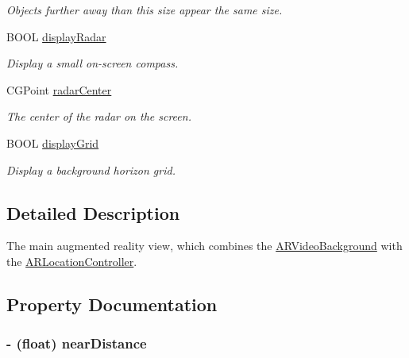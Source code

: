\begin{DoxyCompactItemize}
\begin{DoxyCompactList}\small\item\em Objects further away than this size appear the same size. \end{DoxyCompactList}\item 
\hypertarget{interface_a_r_browser_view_a541177be5371872bc4153d8eb8805ff2}{B\-O\-O\-L \hyperlink{interface_a_r_browser_view_a541177be5371872bc4153d8eb8805ff2}{display\-Radar}}\label{interface_a_r_browser_view_a541177be5371872bc4153d8eb8805ff2}

\begin{DoxyCompactList}\small\item\em Display a small on-\/screen compass. \end{DoxyCompactList}\item 
C\-G\-Point \hyperlink{interface_a_r_browser_view_ab390eeb9f2a9ce554dbbea33227cb389}{radar\-Center}
\begin{DoxyCompactList}\small\item\em The center of the radar on the screen. \end{DoxyCompactList}\item 
\hypertarget{interface_a_r_browser_view_a767b94294f4358686e88d043198b9881}{B\-O\-O\-L \hyperlink{interface_a_r_browser_view_a767b94294f4358686e88d043198b9881}{display\-Grid}}\label{interface_a_r_browser_view_a767b94294f4358686e88d043198b9881}

\begin{DoxyCompactList}\small\item\em Display a background horizon grid. \end{DoxyCompactList}\end{DoxyCompactItemize}


\subsection{Detailed Description}
The main augmented reality view, which combines the \hyperlink{interface_a_r_video_background}{A\-R\-Video\-Background} with the \hyperlink{interface_a_r_location_controller}{A\-R\-Location\-Controller}. 

\subsection{Property Documentation}
\hypertarget{interface_a_r_browser_view_a7d1856b25014bdbb42e053808fed67b5}{
\subsubsection[{near\-Distance}]{\setlength{\rightskip}{0pt plus 5cm}-\/ (float) {\bf near\-Distance}}}\label{interface_a_r_browser_view_a7d1856b25014bdbb42e053808fed67b5}


